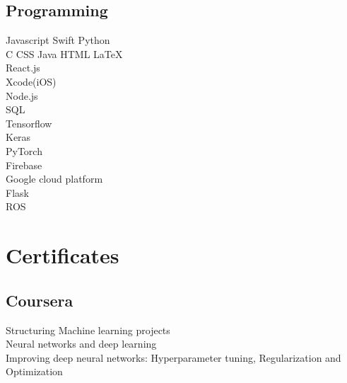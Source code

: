 \documentclass[]{deedy-resume-openfont}
\begin{document}
\begin{minipage}[t]{0.33\textwidth}
\subsection{Programming}
Javascript \textbullet{}  Swift \textbullet{} Python \\
C \textbullet{} CSS \textbullet{} Java \textbullet{} HTML \textbullet{} \LaTeX\ \\
\textbullet{} React.js \\
\textbullet{} Xcode(iOS) \\
\textbullet{} Node.js \\
\textbullet{} SQL \\
\textbullet{} Tensorflow \\
\textbullet{} Keras\\
\textbullet{} PyTorch \\
\textbullet{} Firebase \\
\textbullet{} Google cloud platform \\
\textbullet{} Flask\\
\textbullet{} ROS\\
\sectionsep

\section{Certificates}
\subsection{Coursera}
\textbullet{}Structuring Machine learning projects\\ \textbullet{} Neural networks and deep learning \\
\textbullet{} Improving deep neural networks: Hyperparameter tuning, Regularization and Optimization

\sectionsep

%
%

\end{minipage} 
\hfill
\end{document}
